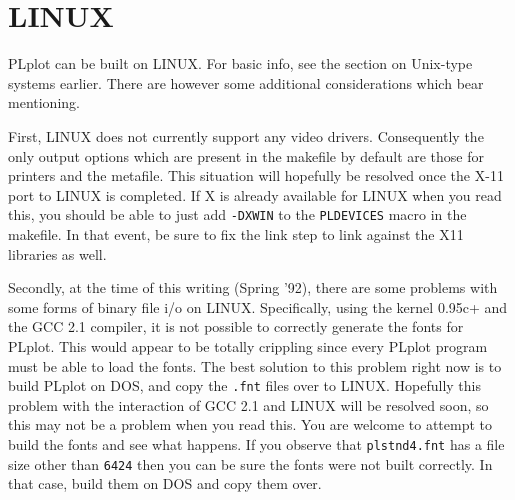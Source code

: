 \section{LINUX}

PLplot can be built on LINUX.  For basic info, see the section on Unix-type
systems earlier.  There are however some additional considerations which
bear mentioning.

First, LINUX does not currently support any video drivers.  Consequently the
only output options which are present in the makefile by default are those
for printers and the metafile.  This situation will hopefully be resolved
once the X-11 port to LINUX is completed.  If X is already available for
LINUX when you read this, you should be able to just add {\tt -DXWIN} to
the {\tt PLDEVICES} macro in the makefile.  In that event, be sure to fix
the link step to link against the X11 libraries as well.

Secondly, at the time of this writing (Spring '92), there are some problems
with some forms of binary file i/o on LINUX.  Specifically, using the
kernel 0.95c+ and the GCC 2.1 compiler, it is not possible to correctly
generate the fonts for PLplot.  This would appear to be totally crippling
since every PLplot program must be able to load the fonts.  The best
solution to this problem right now is to build PLplot on DOS, and copy the
{\tt *.fnt} files over to LINUX.  Hopefully this problem with the
interaction of GCC 2.1 and LINUX will be resolved soon, so this may not be
a problem when you read this.  You are welcome to attempt to build the
fonts and see what happens.  If you observe that {\tt plstnd4.fnt} has a
file size other than {\tt 6424} then you can be sure the fonts were not
built correctly.  In that case, build them on DOS and copy them over.
